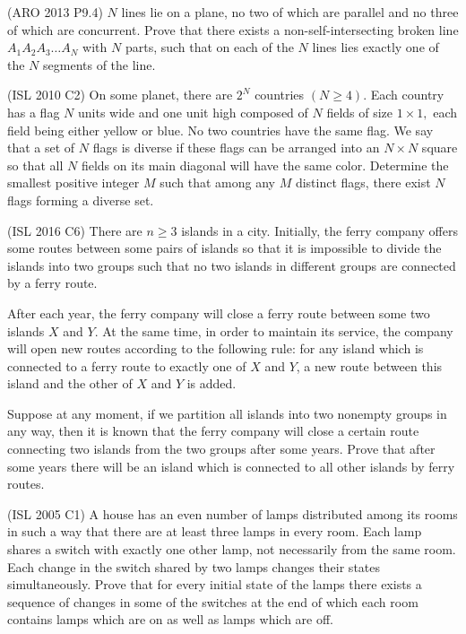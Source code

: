 \documentclass[12pt,a4paper]{article}
\begin{document}
		\begin{problem}(ARO 2013 P9.4)
			$ N $ lines lie on a plane, no two of which are parallel and no three of which are concurrent. Prove that there exists a non-self-intersecting broken line $ A_1A_2A_3\dots A_N $ with $ N $ parts, such that on each of the $ N $ lines lies exactly one of the $ N $ segments of the line.
		\end{problem}
	
		\begin{problem}(ISL 2010 C2)
			On some planet, there are $2^N$ countries $(N \geq 4).$ Each country has a flag $N$ units wide and one unit high composed of $N$ fields of size $1 \times 1,$ each field being either yellow or blue. No two countries have the same flag. We say that a set of $N$ flags is diverse if these flags can be arranged into an $N \times N$ square so that all $N$ fields on its main diagonal will have the same color. Determine the smallest positive integer $M$ such that among any $M$ distinct flags, there exist $N$ flags forming a diverse set.
		\end{problem}
		
		\begin{problem}(ISL 2016 C6)
			There are $ n \geq 3 $ islands in a city. Initially, the ferry company offers some routes between some pairs of islands so that it is impossible to divide the islands into two groups such that no two islands in different groups are connected by a ferry route.
			
			After each year, the ferry company will close a ferry route between some two islands $ X $ and $ Y $. At the same time, in order to maintain its service, the company will open new routes according to the following rule: for any island which is connected to a ferry route to exactly one of $ X $ and $ Y $, a new route between this island and the other of $ X $ and $ Y $ is added.
			
			Suppose at any moment, if we partition all islands into two nonempty groups in any way, then it is known that the ferry company will close a certain route connecting two islands from the two groups after some years. Prove that after some years there will be an island which is connected to all other islands by ferry routes.
		\end{problem}
		
		\begin{problem}(ISL 2005 C1)
			A house has an even number of lamps distributed among its rooms in such a way that there are at least three lamps in every room. Each lamp shares a switch with exactly one other lamp, not necessarily from the same room. Each change in the switch shared by two lamps changes their states simultaneously. Prove that for every initial state of the lamps there exists a sequence of changes in some of the switches at the end of which each room contains lamps which are on as well as lamps which are off.
		\end{problem}
	
\end{document}
